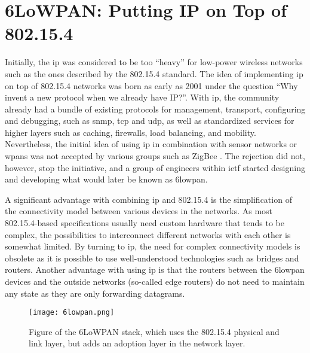 \section{6LoWPAN: Putting IP on Top of 802.15.4}
\label{sec:6lowpan}


Initially, the \gls{ip} was considered to be too ``heavy'' for low-power wireless networks such as the ones described by the 802.15.4 standard. The idea of implementing \gls{ip} on top of 802.15.4 networks was born as early as 2001 under the question ``Why invent a new protocol when we already have IP?''\cite{Mulligan2007}. With \gls{ip}, the community already had a bundle of existing protocols for management, transport, configuring and debugging, such as \gls{snmp}, \gls{tcp} and \gls{udp}, as well as standardized services for higher layers such as caching, firewalls, load balancing, and mobility. Nevertheless, the initial idea of using \gls{ip} in combination with sensor networks or \gls{wpan}s was not accepted by various groups such as ZigBee \cite{Mulligan2007}. The rejection did not, however, stop the initiative, and a group of engineers within \gls{ietf} started designing and developing what would later be known as \gls{6lowpan}.

A significant advantage with combining \gls{ip} and 802.15.4 is the simplification of the connectivity model between various devices in the networks. As most 802.15.4-based specifications usually need custom hardware that tends to be complex, the possibilities to interconnect different networks with each other is somewhat limited. By turning to \gls{ip}, the need for complex connectivity models is obsolete as it is possible to use well-understood technologies such as bridges and routers. Another advantage with using \gls{ip} is that the routers between the \gls{6lowpan} devices and the outside networks (so-called edge routers) do not need to maintain any state as they are only forwarding datagrams.

\begin{figure}[h]
	\centering
	\texttt{[image: 6lowpan.png]}
	\caption{Figure of the 6LoWPAN stack, which uses the 802.15.4 physical and link layer, but adds an adoption layer in the network layer.}
	\label{fig:6lowpan-stack}
\end{figure}

